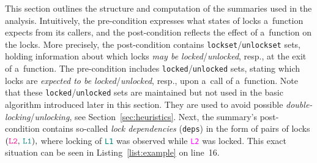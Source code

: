 \documentclass[runningheads]{llncs}
\begin{document}
This section outlines the structure and computation of the summaries used
in the analysis. Intuitively, the pre-condition expresses what states of
locks a~function expects from its callers, and the post-condition reflects
the effect of a~function on the locks. More precisely, the post-condition
contains \texttt{lockset}/\texttt{unlockset} sets, holding information about
which locks \emph{may be locked}/\emph{unlocked}, resp., at the exit of
a~function. The pre-condition includes \texttt{locked}/\texttt{unlocked}
sets, stating which locks are \emph{expected to be locked}/\emph{unlocked},
resp., upon a~call of a~function. Note that these
\texttt{locked}/\texttt{un\-locked} sets are maintained but not used in the
basic algorithm introduced later in this section. They are used to avoid
possible \emph{double-locking}/\emph{unlocking}, see
Section~\ref{sec:heuristics}. Next, the summary's post-condition contains
so-called \emph{lock dependencies} (\texttt{deps}) in the form of pairs of
locks $ (\text{\texttt{\textcolor{magenta}{L2}},
\texttt{\textcolor{teal}{L1}}}), $ where locking of
\texttt{\textcolor{teal}{L1}} was observed while
\texttt{\textcolor{magenta}{L2}} was locked. This exact situation can be
seen in Listing~\ref{list:example} on line~16.
\end{document}
